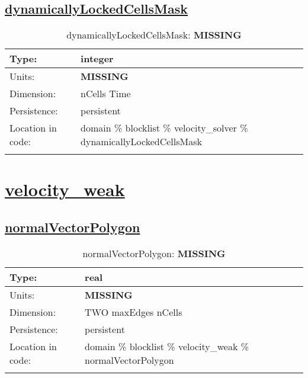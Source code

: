 \subsection[dynamicallyLockedCellsMask]{\hyperref[sec:var_tab_velocity_solver]{dynamicallyLockedCellsMask}}
\label{subsec:var_sec_velocity_solver_dynamicallyLockedCellsMask}
\begin{center}
\begin{longtable}{| p{2.0in} | p{4.0in} |}
        \hline 
        Type: & integer \\
        \hline 
        Units: & {\bf \color{red} MISSING} \\
        \hline 
        Dimension: & nCells Time \\
        \hline 
        Persistence: & persistent \\
        \hline 
         Location in code: & domain \% blocklist \% velocity\_solver \% dynamicallyLockedCellsMask \\
         \hline 
    \caption{dynamicallyLockedCellsMask: {\bf \color{red} MISSING}}
\end{longtable}
\end{center}
\section[velocity\_weak]{\hyperref[sec:var_tab_velocity_weak]{velocity\_weak}}
\label{sec:var_sec_velocity_weak}
\subsection[normalVectorPolygon]{\hyperref[sec:var_tab_velocity_weak]{normalVectorPolygon}}
\label{subsec:var_sec_velocity_weak_normalVectorPolygon}
\begin{center}
\begin{longtable}{| p{2.0in} | p{4.0in} |}
        \hline 
        Type: & real \\
        \hline 
        Units: & {\bf \color{red} MISSING} \\
        \hline 
        Dimension: & TWO maxEdges nCells \\
        \hline 
        Persistence: & persistent \\
        \hline 
         Location in code: & domain \% blocklist \% velocity\_weak \% normalVectorPolygon \\
         \hline 
    \caption{normalVectorPolygon: {\bf \color{red} MISSING}}
\end{longtable}
\end{center}
